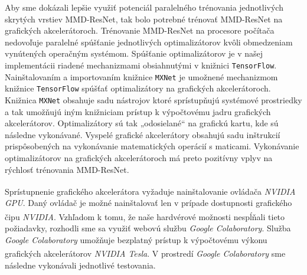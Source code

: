 Aby sme dokázali lepšie využiť potenciál paralelného trénovania jednotlivých skrytých vrstiev MMD-ResNet, tak bolo potrebné trénovať MMD-ResNet na grafických akcelerátoroch. Trénovanie MMD-ResNet na procesore počítača nedovoľuje paralelné spúšťanie jednotlivých optimalizátorov kvôli obmedzeniam vynútených operačným systémom. Spúšťanie optimalizátorov je v našej implementácii riadené mechanizmami obsiahnutými v knižnici \texttt{TensorFlow}. Nainštalovaním a importovaním knižnice \texttt{MXNet} je umožnené mechanizmom knižnice \texttt{TensorFlow} spúšťať optimalizátory na grafických akcelerátoroch. Knižnica \texttt{MXNet} obsahuje sadu nástrojov ktoré sprístupňujú systémové prostriedky a tak umožňujú iným knižniciam prístup k výpočtovému jadru grafických akcelerátorov. Optimalizátory sú tak „odosielané“ na grafickú kartu, kde sú následne vykonávané. Vyspelé grafické akcelerátory obsahujú sadu inštrukcií prispôsobených na vykonávanie matematických operácií s maticami. Vykonávanie optimalizátorov na grafických akcelerátoroch má preto pozitívny vplyv na rýchlosť trénovania MMD-ResNet.

Sprístupnenie grafického akcelerátora vyžaduje nainštalovanie ovládača \textit{NVIDIA\textsuperscript{\textregistered} GPU}. Daný ovládač je možné nainštalovať len v prípade dostupnosti grafického čipu \textit{NVIDIA\textsuperscript{\textregistered}}. Vzhľadom k tomu, že naše hardvérové možnosti nespĺňali tieto požiadavky, rozhodli sme sa využiť webovú službu \textit{Google Colaboratory}. Služba \textit{Google Colaboratory} umožňuje bezplatný prístup k výpočtovému výkonu grafických akcelerátorov \textit{NVIDIA\textsuperscript{\textregistered} Tesla}. V prostredí \textit{Google Colaboratory} sme následne vykonávali jednotlivé testovania.